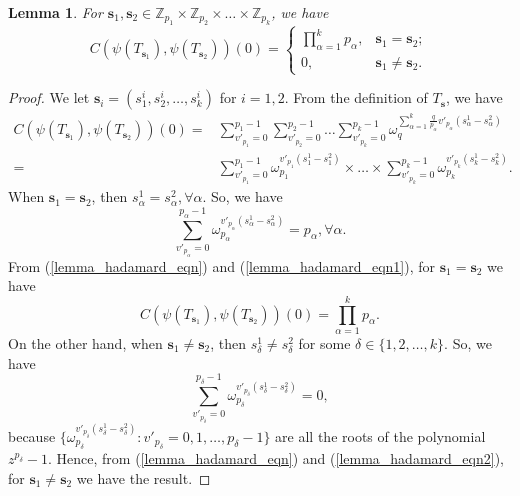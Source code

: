 \documentclass[pdflatex,sn-mathphys-num]{sn-jnl}%
\theoremstyle{thmstyleone}
\newtheorem{lemma}{Lemma}
\begin{document}
	\begin{lemma}\label{lemma_hadamard}
		For $\mathbf{s}_1, \mathbf{s}_2 \in \mathbb{Z}_{p_1} \times \mathbb{Z}_{p_2} \times \dots \times \mathbb{Z}_{p_k}$, we have
		\begin{equation}\label{Lemma_2_eqn}
			C \left( \psi( T_{\mathbf{s}_1}), \psi( T_{\mathbf{s}_2}) \right) (0) =
			\begin{cases}
				\prod_{\alpha=1}^{k} p_\alpha, & \mathbf{s}_1 = \mathbf{s}_2;\\
				0, & \mathbf{s}_1 \neq \mathbf{s}_2.
			\end{cases}
		\end{equation}
	\end{lemma}
	\begin{proof}
		We let $\mathbf{s}_i= (s^i_1, s^i_2, \dots, s^i_k)$ for $i=1,2$.
		From the definition of $T_\mathbf{s}$, we have
		\begin{equation}\label{lemma_hadamard_eqn}
			\begin{split}
				C \left( \psi( T_{\mathbf{s}_1}), \psi( T_{\mathbf{s}_2}) \right) (0)
				= &\sum_{v'_{p_1} = 0}^{p_1-1}   \sum_{v'_{p_2} = 0}^{p_2-1} \dots \sum_{v'_{p_k} = 0}^{p_k-1} \omega_q^{\sum_{\alpha=1}^{k} \frac{q}{p_\alpha} v'_{p_\alpha} (s^1_\alpha- s^2_\alpha)}\\
				= &\sum_{v'_{p_1} = 0}^{p_1-1} \omega_{p_1}^{  v'_{p_1} (s^1_1- s^2_1)} \times \dots \times \sum_{v'_{p_k} = 0}^{p_k-1} \omega_{p_k}^{  v'_{p_k} (s^1_k- s^2_k)}.
			\end{split}			
		\end{equation}
		When $\mathbf{s}_1 = \mathbf{s}_2$, then $s^1_\alpha= s^2_\alpha, \forall \alpha$. So, we have
		\begin{equation}\label{lemma_hadamard_eqn1}
			\sum_{v'_{p_\alpha} = 0}^{p_\alpha-1} \omega_{p_\alpha}^{  v'_{p_\alpha} (s^1_\alpha- s^2_\alpha)}= p_\alpha, \forall \alpha.
		\end{equation}
		From (\ref{lemma_hadamard_eqn}) and (\ref{lemma_hadamard_eqn1}), for $\mathbf{s}_1 = \mathbf{s}_2$ we have
		\begin{equation}
			C \left( \psi( T_{\mathbf{s}_1}), \psi( T_{\mathbf{s}_2}) \right) (0) =  \prod_{\alpha=1}^{k} p_{\alpha}.
		\end{equation}
		On the other hand, when $\mathbf{s}_1 \neq \mathbf{s}_2$, then $s^1_\delta \neq s^2_\delta$ for some $\delta \in \{1,2, \dots, k\}$. So, we have
		\begin{equation}\label{lemma_hadamard_eqn2}
			\sum_{v'_{p_\delta} = 0}^{p_\delta-1} \omega_{p_\delta}^{  v'_{p_\delta} (s^1_\delta- s^2_\delta)}=0,
		\end{equation}
		because $\{\omega_{p_\delta}^{  v'_{p_\delta} (s^1_\delta- s^2_\delta)}:  v'_{p_\delta} =0,1, \dots,p_\delta-1\}$ are all the roots of the polynomial $z^{p_\delta}-1$.
		Hence, from (\ref{lemma_hadamard_eqn}) and (\ref{lemma_hadamard_eqn2}), for  $\mathbf{s}_1 \neq \mathbf{s}_2$ we have the result.
	\end{proof}
	
\end{document}

